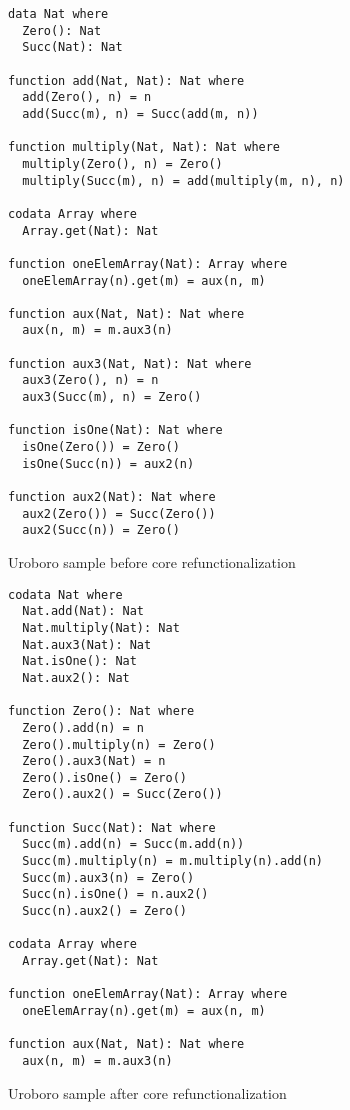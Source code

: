 \begin{figure}
\begin{lstlisting}
data Nat where
  Zero(): Nat
  Succ(Nat): Nat

function add(Nat, Nat): Nat where
  add(Zero(), n) = n
  add(Succ(m), n) = Succ(add(m, n))

function multiply(Nat, Nat): Nat where
  multiply(Zero(), n) = Zero()
  multiply(Succ(m), n) = add(multiply(m, n), n)

codata Array where
  Array.get(Nat): Nat

function oneElemArray(Nat): Array where
  oneElemArray(n).get(m) = aux(n, m)

function aux(Nat, Nat): Nat where
  aux(n, m) = m.aux3(n)

function aux3(Nat, Nat): Nat where
  aux3(Zero(), n) = n
  aux3(Succ(m), n) = Zero()

function isOne(Nat): Nat where
  isOne(Zero()) = Zero()
  isOne(Succ(n)) = aux2(n)

function aux2(Nat): Nat where
  aux2(Zero()) = Succ(Zero())
  aux2(Succ(n)) = Zero()

\end{lstlisting}
\caption{Uroboro sample before core refunctionalization}
\label{fig:ch4urosampleprerefunc}
\end{figure}

\begin{figure}
\begin{lstlisting}
codata Nat where
  Nat.add(Nat): Nat
  Nat.multiply(Nat): Nat
  Nat.aux3(Nat): Nat
  Nat.isOne(): Nat
  Nat.aux2(): Nat

function Zero(): Nat where
  Zero().add(n) = n
  Zero().multiply(n) = Zero()
  Zero().aux3(Nat) = n
  Zero().isOne() = Zero()
  Zero().aux2() = Succ(Zero())

function Succ(Nat): Nat where
  Succ(m).add(n) = Succ(m.add(n))
  Succ(m).multiply(n) = m.multiply(n).add(n)
  Succ(m).aux3(n) = Zero()
  Succ(n).isOne() = n.aux2()
  Succ(n).aux2() = Zero()

codata Array where
  Array.get(Nat): Nat

function oneElemArray(Nat): Array where
  oneElemArray(n).get(m) = aux(n, m)

function aux(Nat, Nat): Nat where
  aux(n, m) = m.aux3(n)

\end{lstlisting}
\caption{Uroboro sample after core refunctionalization}
\label{fig:ch4urosamplepostrefunc}
\end{figure}

